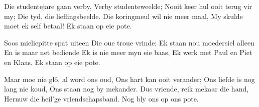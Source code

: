 \footnotemark [
ititle={Studentenlied}]


\beginverse
Die studentejare gaan verby,
Verby studenteweelde;
Nooit keer hul ooit terug vir my;
Die tyd, die lieflingsbeelde.
Die koringmeul wil nie meer maal,
My skulde moet ek self betaal!
{Ek staan op eie pote.}
\endverse

\beginverse
Soos mieliepitte spat uiteen
Die oue troue vrinde;
Ek staan nou moedersiel alleen
En is maar net bediende
Ek is nie meer myn eie baas,
Ek werk met Paul en Piet en Klaas.
{Ek staan op eie pote.}
\endverse

\beginverse
Maar moe nie glô, al word ons oud,
Ons hart kan ooit verander;
Ons liefde is nog lang nie koud,
Ons staan nog by mekander.
Dus vriende, reik mekaar die hand,
Hernuw die heil'ge vriendschapsband.
{Nog bly ons op ons pote.}
\endverse
\endsong